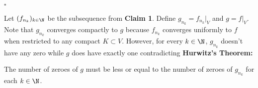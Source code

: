 $ $\hfill $\square$

Let $(f_{n_k})_{k\in \N}$ be the subsequence from \textbf{Claim 1}. Define $g_{n_k} = f_{n_k} |_V$ and $g = f|_V$. Note that $g_{n_k}$ converges compactly to $g$ because $f_{n_k}$ converges uniformly to $f$ when restricted to any compact $K\subset V$. However, for every $k \in \N$, $g_{n_k}$ doesn't have any zero while $g$ does have exactly one contradicting \textbf{Hurwitz's Theorem:}

The number of zeroes of $g$ must be less or equal to the number of zeroes of $g_{n_k}$ for each $k \in \N$.